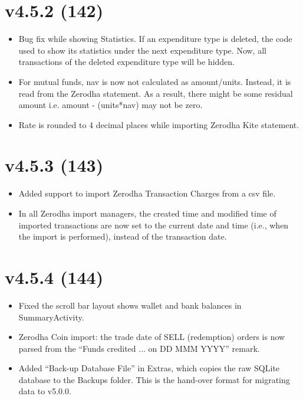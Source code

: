 \documentclass{article}
\begin{document}
    \section{v4.5.2 (142)}\label{sec:142}
    \begin{itemize}
        \item Bug fix while showing Statistics.
        If an expenditure type is deleted, the code used to show its statistics under the next expenditure type.
        Now, all transactions of the deleted expenditure type will be hidden.
        \item For mutual funds, nav is now not calculated as amount/units.
        Instead, it is read from the Zerodha statement.
        As a result, there might be some residual amount i.e. amount - (units*nav) may not be zero.
        \item Rate is rounded to 4 decimal places while importing Zerodha Kite statement.
    \end{itemize}


    \section{v4.5.3 (143)}\label{sec:143}
    \begin{itemize}
        \item Added support to import Zerodha Transaction Charges from a csv file.
        \item In all Zerodha import managers, the created time and modified time of imported transactions are now set to the current date and time (i.e., when the import is performed), instead of the transaction date.
    \end{itemize}

    \section{v4.5.4 (144)}\label{sec:144}
    \begin{itemize}
        \item Fixed the scroll bar layout shows wallet and bank balances in SummaryActivity.
        \item Zerodha Coin import: the trade date of SELL (redemption) orders is now parsed from the ``Funds credited ... on DD MMM YYYY'' remark.
        \item Added ``Back-up Database File'' in Extras, which copies the raw SQLite database to the Backups folder. This is the hand-over format for migrating data to v5.0.0.
    \end{itemize}
\end{document}
